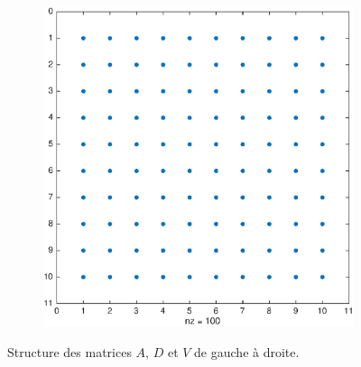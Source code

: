 \begin{figure}[h!]
\begin{subfigure}[b]{0.3\linewidth}
  \end{subfigure}
  \begin{subfigure}[b]{0.3\linewidth}
    \centering
    \includegraphics[scale=0.2]{s1/matlab/V} 
  \end{subfigure} 
  \caption{Structure des matrices $A$, $D$ et $V$ de gauche à droite.}
  \label{fig:structure}
\end{figure}


